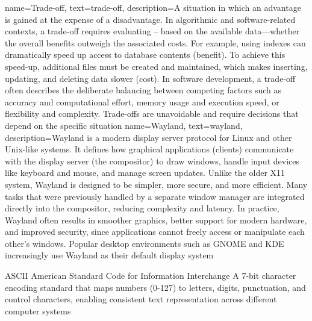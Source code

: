 {
	name={Trade-off},
	text={trade-off},
	description={A situation in which an advantage is gained at the expense of a disadvantage. In algorithmic and software-related contexts, a trade-off requires evaluating -- based on the available data—whether the overall benefits outweigh the associated costs. For example, using indexes can dramatically speed up access to database contents (benefit). To achieve this speed-up, additional files must be created and maintained, which makes inserting, updating, and deleting data slower (cost). In software development, a trade-off often describes the deliberate balancing between competing factors such as accuracy and computational effort, memory usage and execution speed, or flexibility and complexity. Trade-offs are unavoidable and require decisions that depend on the specific situation}
}
{
	name={Wayland},
	text={wayland},
	description={Wayland is a modern display server protocol for Linux and other Unix-like systems. It defines how graphical applications (clients) communicate with the display server (the compositor) to draw windows, handle input devices like keyboard and mouse, and manage screen updates. Unlike the older X11 system, Wayland is designed to be simpler, more secure, and more efficient. Many tasks that were previously handled by a separate window manager are integrated directly into the compositor, reducing complexity and latency.	In practice, Wayland often results in smoother graphics, better support for modern hardware, and improved security, since applications cannot freely access or manipulate each other’s windows. Popular desktop environments such as GNOME and KDE increasingly use Wayland as their default display system}
}

	{ASCII}            %
	{American Standard Code for Information Interchange}         %
	{A 7-bit character encoding standard that maps numbers (0-127) to letters, digits, punctuation, and control characters, enabling consistent text representation across different computer systems} %


